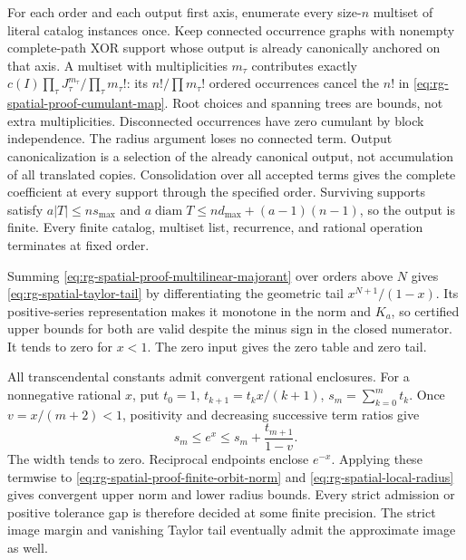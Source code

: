 For each order and each output first axis, enumerate every size-\(n\)
multiset of literal catalog instances once. Keep connected occurrence
graphs with nonempty complete-path XOR support whose output is already
canonically anchored on that axis. A multiset with multiplicities
\(m_\tau\) contributes exactly
\(c(I)\prod_\tau J_\tau^{m_\tau}/\prod_\tau m_\tau!\): its
\(n!/\prod m_\tau!\) ordered occurrences cancel the \(n!\) in
\cref{eq:rg-spatial-proof-cumulant-map}. Root choices and spanning trees
are bounds, not extra multiplicities. Disconnected occurrences have zero
cumulant by block independence. The radius argument loses no connected
term. Output canonicalization is a selection of the already canonical
output, not accumulation of all translated copies. Consolidation over all
accepted terms gives the complete coefficient at every support through the
specified order. Surviving supports satisfy
\(a|T|\le ns_{\max}\) and
\(a\operatorname{diam}T\le nd_{\max}+(a-1)(n-1)\), so the output is
finite. Every finite catalog, multiset list, recurrence, and rational
operation terminates at fixed order.

Summing \cref{eq:rg-spatial-proof-multilinear-majorant} over orders above
\(N\) gives \cref{eq:rg-spatial-taylor-tail} by differentiating the
geometric tail \(x^{N+1}/(1-x)\). Its positive-series representation
makes it monotone in the norm and \(K_a\), so certified upper bounds for
both are valid despite the minus sign in the closed numerator. It tends to
zero for \(x<1\). The zero input gives the zero table and zero tail.

All transcendental constants admit convergent rational enclosures. For a
nonnegative rational \(x\), put \(t_0=1\),
\(t_{k+1}=t_kx/(k+1)\), \(s_m=\sum_{k=0}^mt_k\). Once
\(v=x/(m+2)<1\), positivity and decreasing successive term ratios give
\begin{equation}
 s_m\le e^x\le s_m+\frac{t_{m+1}}{1-v}.
 \label{eq:rg-spatial-proof-exp-enclosure}
\end{equation}
The width tends to zero. Reciprocal endpoints enclose \(e^{-x}\).
Applying these termwise to \cref{eq:rg-spatial-proof-finite-orbit-norm}
and \cref{eq:rg-spatial-local-radius} gives convergent upper norm and lower
radius bounds. Every strict admission or positive tolerance gap is
therefore decided at some finite precision. The strict image margin and
vanishing Taylor tail eventually admit the approximate image as well.

